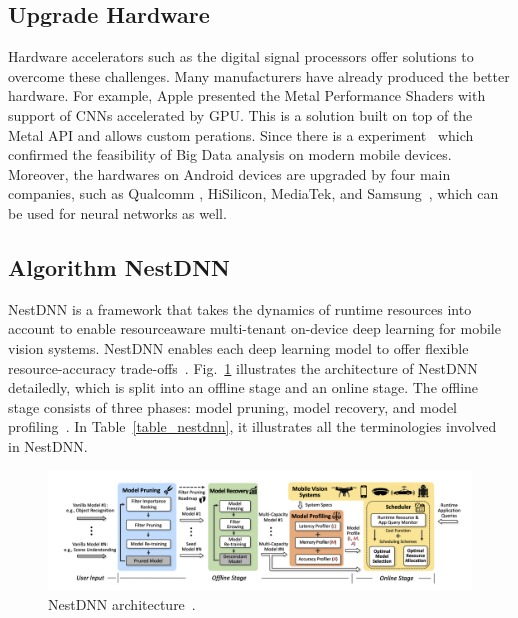 \documentclass{article}
\begin{document}
\subsection{Upgrade Hardware}\label{upgrade_hardware}
Hardware accelerators such as the digital signal processors offer solutions to overcome these challenges. Many manufacturers have already produced the better hardware. For example, Apple presented the Metal Performance Shaders with support of CNNs accelerated by GPU. This is a solution built on top of the Metal API and allows custom perations. Since there is a experiment~\cite{akusok2019metal} which confirmed the feasibility of Big Data analysis on modern mobile devices. Moreover, the hardwares on Android devices are upgraded by four main companies, such as Qualcomm , HiSilicon, MediaTek, and Samsung~\cite{Andrey2019Aibenchmark}, which can be used for neural networks as well.

\subsection{Algorithm NestDNN}\label{nestdnn}
NestDNN is a framework that takes the dynamics of runtime resources into account to enable resourceaware multi-tenant on-device deep learning for mobile vision systems. NestDNN enables each deep learning model to offer flexible resource-accuracy trade-offs~\cite{fang2018nestdnn}. Fig.~\ref{nestdnn_arch} illustrates the architecture of NestDNN detailedly, which is split into an offline stage and an online stage. The offline stage consists of three phases: model pruning, model recovery, and model profiling~\cite{fang2018nestdnn}. In Table~\ref{table_nestdnn}, it illustrates all the terminologies involved in NestDNN.

	\begin{figure}[htbp]
	\centering
	\includegraphics[width=1\linewidth]{figure/nestdnn_architecture.png}
	\caption{NestDNN architecture~\cite{fang2018nestdnn}.}
	\label{nestdnn_arch}
\end{figure}
\end{document}
